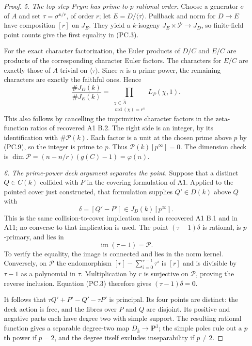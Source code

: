 \begin{proof}
\emph{5. The top-step Prym has prime-to-$p$ rational order.}
Choose a generator $\sigma$ of $A$ and set
$\tau=\sigma^{n/r}$, of order $r$; let $E=D/\langle\tau\rangle$.
Pullback and norm for $D\to E$ have composition $[r]$ on $J_E$.
They yield a $k$-isogeny
$J_E\times\mathcal P\to J_D$, so finite-field point counts give
the first equality in (PC.3).

For the exact character factorization, the Euler products of
$D/C$ and $E/C$ are products of the corresponding character
Euler factors. The characters for $E/C$ are exactly those of $A$
trivial on $\langle\tau\rangle$. Since $n$ is a prime power,
the remaining characters are exactly the faithful ones. Hence
\[
 \frac{\#J_D(k)}{\#J_E(k)}
       =\prod_{\substack{\chi\in\widehat A\\
                          \operatorname{ord}(\chi)=r^a}}
                       L_P(\chi,1).
 \tag{PC.10}
\]
This also follows by cancelling the imprimitive character factors
in the zeta-function ratios of recovered A1 B.2. The right side
is an integer, by its identification with $\#\mathcal P(k)$.
Each factor is a unit at the chosen prime above $p$ by (PC.9),
so the integer is prime to $p$. Thus
$\mathcal P(k)[p^\infty]=0$. The dimension check is
$\dim\mathcal P=(n-n/r)(g(C)-1)=\varphi(n)$.

\emph{6. The prime-power deck argument separates the point.}
Suppose that a distinct $Q\in C(k)$ collided with $P$ in the
covering formulation of A1. Applied to the pointed cover just
constructed, that formulation supplies $Q'\in D(k)$ above $Q$
with
\[
                  \delta=[Q'-P']\in J_D(k)[p^\infty].
 \tag{PC.11}
\]
This is the same collision-to-cover implication used in recovered
A1 B.1 and in A11; no converse to that implication is used.
The point $(\tau-1)\delta$ is rational, is $p$-primary, and lies in
\[
             \operatorname{im}(\tau-1)=\mathcal P.
 \tag{PC.12}
\]
To verify the equality, the image is connected and lies in the
norm kernel. Conversely, on $\mathcal P$ the endomorphism
$[r]-\sum_{i=0}^{r-1}\tau^i$ is $[r]$ and is divisible by
$\tau-1$ as a polynomial in $\tau$. Multiplication by $r$ is
surjective on $\mathcal P$, proving the reverse inclusion.
Equation (PC.3) therefore gives $(\tau-1)\delta=0$.

It follows that
$\tau Q'+P'-Q'-\tau P'$ is principal. Its four points are
distinct: the deck action is free, and the fibres over $P$ and
$Q$ are disjoint. Its positive and negative parts each have
degree two with simple support. The resulting rational function
gives a separable degree-two map $D_{\bar k}\to\mathbf P^1$;
the simple poles rule out a $p$th power if $p=2$, and the degree
itself excludes inseparability if $p\ne2$.


\end{proof}
